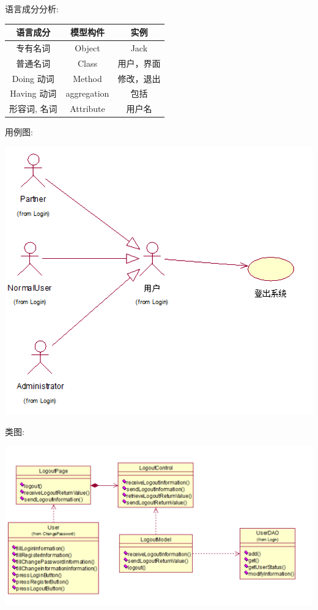 \documentclass[11pt]{article}
\begin{document}
			语言成分分析:
			\begin{center}
			\begin{tabular}{|c|c|c|}
			\hline
			语言成分 & 模型构件 & 实例\\ \hline
			专有名词 & Object & Jack  \\ \hline
			普通名词 & Class & 用户，界面 \\ \hline
			Doing 动词 & Method &  修改，退出 \\ \hline
			Having 动词 & aggregation & 包括 \\ \hline
			形容词, 名词 & Attribute & 用户名 \\ \hline
			\end{tabular}
			\end{center}
			
			用例图: 
			\begin{center}
			\includegraphics[scale=0.42]{登出_用例图.png}
			\end{center}

			类图: 
			\begin{center}
			\includegraphics[scale=0.42]{登出_类图.png}
			\end{center}
\end{document}
